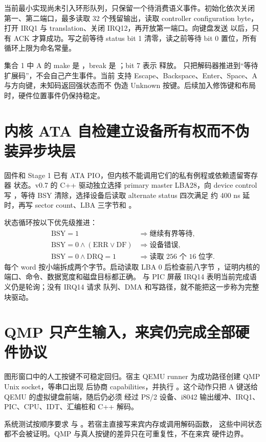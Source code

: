 当前最小实现尚未引入环形队列，只保留一个待消费语义事件。初始化依次关闭
第一、第二端口，最多读取 32 个残留输出，读取 controller configuration
byte，打开 IRQ1 与 translation、关闭 IRQ12，再开放第一端口。向键盘发送
 以后，只有  ACK 才算成功。写之前等待 status
bit 1 清零，读之前等待 bit 0 置位，所有循环上限为命名常量。

集合 1 中 A 的 make 是 ，break 是 ；bit 7 表示
释放。 只把解码器推进到“等待扩展码”，不会自己产生事件。当前
支持 Escape、Backspace、Enter、Space、A 与方向键，未知码返回强状态而不
伪造 Unknown 按键。后续加入修饰键和布局时，硬件位置事件仍保持稳定。

\section{内核 ATA 自检建立设备所有权而不伪装异步块层}

固件和 Stage 1 已有 ATA PIO，但内核不能调用它们的私有例程或依赖遗留寄存器
状态。v0.7 的 C++ 驱动独立选择 primary master LBA28，向 device control
写 ，等待 BSY 清除，选择设备后读取 alternate status 四次满足
约 400 ns 延时，再写 sector count、LBA 三字节和 。

状态循环按以下优先级推进：
\[
\begin{aligned}
\mathrm{BSY}=1 &\Rightarrow \text{继续有界等待},\\
\mathrm{BSY}=0\land(\mathrm{ERR}\lor\mathrm{DF}) &\Rightarrow \text{设备错误},\\
\mathrm{BSY}=0\land\mathrm{DRQ}=1 &\Rightarrow \text{读取 256 个 16 位字}.
\end{aligned}
\]
每个 word 按小端拆成两个字节。启动读取 LBA 0 后检查前八字节
，证明内核的端口、命令、数据宽度和磁盘目标都正确。
 与 PIC 屏蔽 IRQ14 表明当前完成语义仍是轮询；没有 IRQ14 请求
队列、DMA 和写路径，就不能把这一步称为完整块驱动。

\section{QMP 只产生输入，来宾仍完成全部硬件协议}

图形窗口中的人工按键不可稳定回归。宿主 QEMU runner 为成功路径创建 QMP
Unix socket，等串口出现  后协商 capabilities，并执行
。这个动作只把 A 键送给 QEMU 的虚拟键盘前端，随后仍必须
经过 PS/2 设备、i8042 输出缓冲、IRQ1、PIC、CPU、IDT、汇编桩和 C++ 解码。

系统测试按顺序要求  与
。若宿主直接写来宾内存或调用解码函数，
这些中间状态都不会被证明。QMP 与真人按键的差异只在可重复性，不在来宾
硬件边界。


